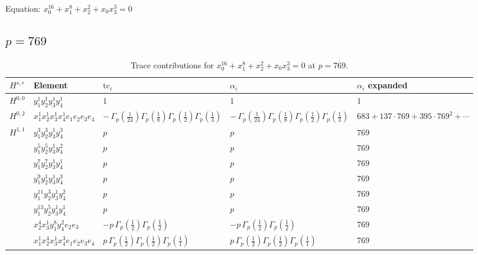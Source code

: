 \documentclass[11pt]{article}
\begin{document}
Equation: $x_0^{16} + x_1^{8} + x_2^{2} + x_0 x_3^{3} = 0$

\subsection*{$p = 769$}

\begin{table}[ht]
\centering
\caption{Trace contributions for $x_0^{16} + x_1^{8} + x_2^{2} + x_0 x_3^{3} = 0$ at $p=769$.}\label{tab:deformed-41}
\renewcommand{\arraystretch}{1.1}
{\scriptsize
\begin{tabular}{@{}lllll@{}}
\toprule
$H^{s,r}$ & Element & $\mathrm{tc}_i$ & $\alpha_i$ & $\alpha_i$ expanded \\
\midrule
$H^{0,0}$ & $y_{1}^{1} y_{2}^{1} y_{3}^{1} y_{4}^{1}$ & $1$ & $1$ & $1$ \\
\midrule
$H^{0,2}$ & $x_{1}^{1} x_{2}^{1} x_{3}^{1} x_{4}^{1}  e_{1} e_{2} e_{3} e_{4}$ & $- \, \Gamma_p \left( \frac{1}{24} \right) \Gamma_p \left( \frac{1}{8} \right) \Gamma_p \left( \frac{1}{2} \right) \Gamma_p \left( \frac{1}{3} \right)$ & $- \, \Gamma_p \left( \frac{1}{24} \right) \Gamma_p \left( \frac{1}{8} \right) \Gamma_p \left( \frac{1}{2} \right) \Gamma_p \left( \frac{1}{3} \right)$ & $683{+}137{\cdot}769{+}395{\cdot}769^{2}{+}\cdots$ \\
\midrule
$H^{1,1}$ & $y_{1}^{3} y_{2}^{3} y_{3}^{1} y_{4}^{3}$ & $p \,$ & $p \,$ & $769$ \\
 & $y_{1}^{5} y_{2}^{5} y_{3}^{1} y_{4}^{2}$ & $p \,$ & $p \,$ & $769$ \\
 & $y_{1}^{7} y_{2}^{7} y_{3}^{1} y_{4}^{1}$ & $p \,$ & $p \,$ & $769$ \\
 & $y_{1}^{9} y_{2}^{1} y_{3}^{1} y_{4}^{3}$ & $p \,$ & $p \,$ & $769$ \\
 & $y_{1}^{11} y_{2}^{3} y_{3}^{1} y_{4}^{2}$ & $p \,$ & $p \,$ & $769$ \\
 & $y_{1}^{13} y_{2}^{5} y_{3}^{1} y_{4}^{1}$ & $p \,$ & $p \,$ & $769$ \\
 & $x_{2}^{4} x_{3}^{1} y_{1}^{8} y_{4}^{2} e_{2} e_{3}$ & $- p \, \Gamma_p \left( \frac{1}{2} \right) \Gamma_p \left( \frac{1}{2} \right)$ & $- p \, \Gamma_p \left( \frac{1}{2} \right) \Gamma_p \left( \frac{1}{2} \right)$ & $769$ \\
 & $x_{1}^{1} x_{2}^{4} x_{3}^{1} x_{4}^{3}  e_{1} e_{2} e_{3} e_{4}$ & $p \, \Gamma_p \left( \frac{1}{2} \right) \Gamma_p \left( \frac{1}{2} \right) \Gamma_p \left( \frac{1}{1} \right)$ & $p \, \Gamma_p \left( \frac{1}{2} \right) \Gamma_p \left( \frac{1}{2} \right) \Gamma_p \left( \frac{1}{1} \right)$ & $769$ \\

\end{tabular}}
\end{table}
\end{document}
